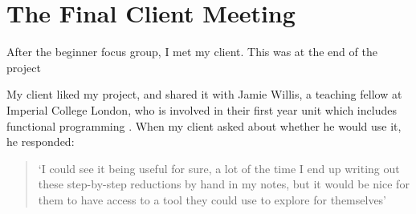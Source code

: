\section{The Final Client Meeting}
\label{c4:client}
After the beginner focus group, I met my client. This was at the end of the project

My client liked my project, and shared it with Jamie Willis, a teaching fellow at Imperial College London, who is involved in their first year unit which includes functional programming \cite{imperialFP}. When my client asked about whether he would use it, he responded:

\begin{quotation}
\noindent `I could see it being useful for sure, a lot of the time I end up writing out these step-by-step reductions by hand in my notes, but it would be nice for them to have access to a tool they could use to explore for themselves'
\end{quotation}





